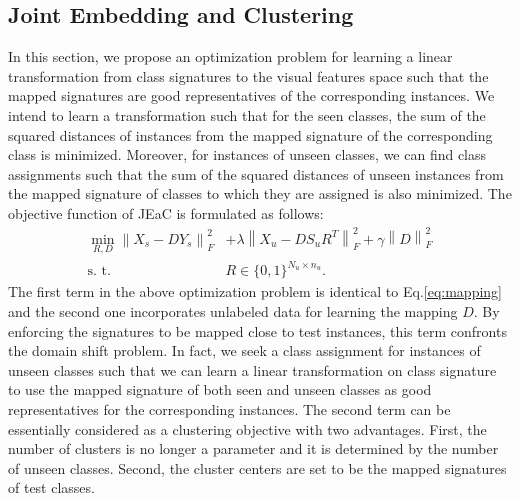 \documentclass[letterpaper]{article}
\newcommand{\norm}[1]{\left \lVert #1 \right \rVert_{F}^2}
\DeclareMathOperator*{\minimize}{min}
\begin{document}
\subsection{Joint Embedding and Clustering}
\label{joint}
 In this section, we propose an optimization problem for learning a linear transformation from class signatures to the visual features space such that
 the mapped signatures are good representatives of the corresponding instances.
 We intend to learn a transformation such that for the seen classes, the sum of the squared distances of instances from the
 mapped signature of the corresponding class is minimized. Moreover,
for instances of unseen classes, we can find class assignments such that the sum of the squared distances of unseen instances from the mapped signature
of classes to which they are assigned is also minimized.
 The objective function of JEaC is formulated as follows:
 \begin{align} \label{eq:main}
   \minimize_{R,D} \norm{X_s - D Y_s}  &+ \lambda \norm{X_u - D S_u R^T } + \gamma \norm{D} \\
   \text{s. t.} \quad & R \in \{0,1\}^{N_u \times n_u}. \nonumber
 \end{align}
The first term in the above optimization problem is identical to Eq.\eqref{eq:mapping} and the second one incorporates unlabeled data for learning the mapping $D$. By enforcing
 the signatures to be mapped close to test instances, this term confronts the domain shift problem. In fact, we seek a class assignment for instances of unseen classes such that we can learn a linear transformation on class signature to use the mapped signature of both seen and unseen classes as good representatives for the corresponding instances.
 The second term can be essentially considered as a clustering objective with two advantages. First, the number of clusters is no longer a
 parameter and it is determined by the number of unseen classes. Second, the cluster centers are set to be the mapped signatures of test classes.
\end{document}
